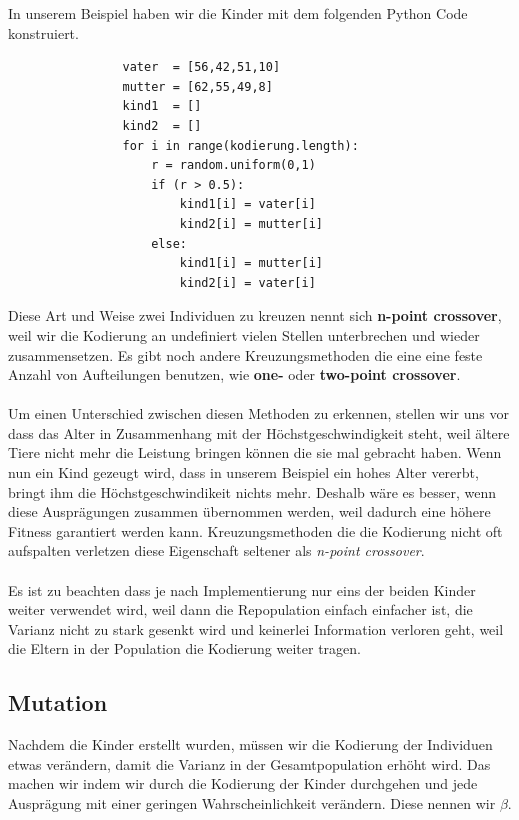             In unserem Beispiel haben wir die Kinder mit dem folgenden Python Code konstruiert.
            \begin{verbatim}
                vater  = [56,42,51,10]
                mutter = [62,55,49,8]
                kind1  = []
                kind2  = []
                for i in range(kodierung.length):
                    r = random.uniform(0,1)
                    if (r > 0.5):
                        kind1[i] = vater[i]
                        kind2[i] = mutter[i]
                    else:
                        kind1[i] = mutter[i]
                        kind2[i] = vater[i]
            \end{verbatim}
            \noindent
            Diese Art und Weise zwei Individuen zu kreuzen nennt sich \textbf{n-point crossover}, weil wir die Kodierung an undefiniert vielen Stellen unterbrechen und wieder zusammensetzen. Es gibt noch andere Kreuzungsmethoden die eine eine feste Anzahl von Aufteilungen benutzen, wie \textbf{one-} oder \textbf{two-point crossover}. \\
            \\
            \noindent
            Um einen Unterschied zwischen diesen Methoden zu erkennen, stellen wir uns vor dass das Alter in Zusammenhang mit der Höchstgeschwindigkeit steht, weil ältere Tiere nicht mehr die Leistung bringen können die sie mal gebracht haben. Wenn nun ein Kind gezeugt wird, dass in unserem Beispiel ein hohes Alter vererbt, bringt ihm die Höchstgeschwindikeit nichts mehr. Deshalb wäre es besser, wenn diese Ausprägungen zusammen übernommen werden, weil dadurch eine höhere Fitness garantiert werden kann. Kreuzungsmethoden die die Kodierung nicht oft aufspalten verletzen diese Eigenschaft seltener als \textit{n-point crossover}.\\
            \\
            \noindent
            Es ist zu beachten dass je nach Implementierung nur eins der beiden Kinder weiter verwendet wird, weil dann die Repopulation einfach  einfacher ist, die Varianz nicht zu stark gesenkt wird und keinerlei Information verloren geht, weil die Eltern in der Population die Kodierung weiter tragen.


        \subsection{Mutation}
            Nachdem die Kinder erstellt wurden, müssen wir die Kodierung der Individuen etwas verändern, damit die Varianz in der Gesamtpopulation erhöht wird. Das machen wir indem wir durch die Kodierung der Kinder durchgehen und jede Ausprägung mit einer geringen Wahrscheinlichkeit verändern. Diese nennen wir $\beta$.


